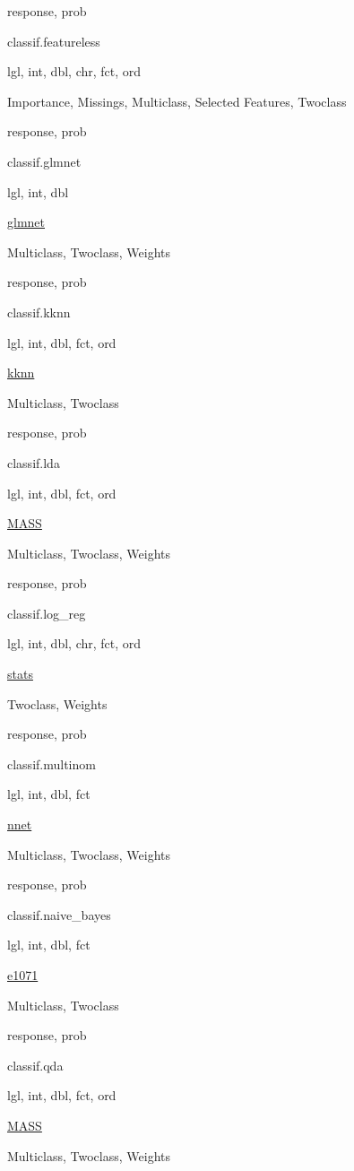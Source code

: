 \documentclass[]{article}
\begin{document}
response, prob

classif.featureless

lgl, int, dbl, chr, fct, ord

Importance, Missings, Multiclass, Selected Features, Twoclass

response, prob

classif.glmnet

lgl, int, dbl

\href{https://cran.r-project.org/package=glmnet}{glmnet}

Multiclass, Twoclass, Weights

response, prob

classif.kknn

lgl, int, dbl, fct, ord

\href{https://cran.r-project.org/package=kknn}{kknn}

Multiclass, Twoclass

response, prob

classif.lda

lgl, int, dbl, fct, ord

\href{https://cran.r-project.org/package=MASS}{MASS}

Multiclass, Twoclass, Weights

response, prob

classif.log\_reg

lgl, int, dbl, chr, fct, ord

\href{https://cran.r-project.org/package=stats}{stats}

Twoclass, Weights

response, prob

classif.multinom

lgl, int, dbl, fct

\href{https://cran.r-project.org/package=nnet}{nnet}

Multiclass, Twoclass, Weights

response, prob

classif.naive\_bayes

lgl, int, dbl, fct

\href{https://cran.r-project.org/package=e1071}{e1071}

Multiclass, Twoclass

response, prob

classif.qda

lgl, int, dbl, fct, ord

\href{https://cran.r-project.org/package=MASS}{MASS}

Multiclass, Twoclass, Weights
\end{document}
